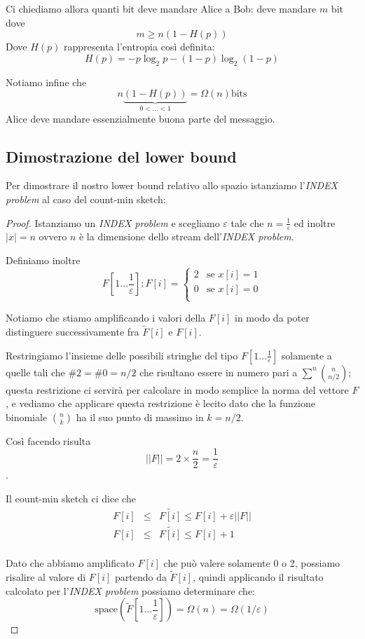 \documentclass[a4paper,11pt]{book}
\begin{document}
Ci chiediamo allora quanti bit deve mandare Alice a Bob: deve mandare $m$ bit dove $$m \geq n(1-H(p))$$
Dove $H(p)$ rappresenta l'entropia cos\`i definita: $$H(p) = -p \log_2 p - (1-p) \log_2 (1-p)$$

Notiamo infine che $$n\underbrace{(1 - H(p))}_{0 < \ldots < 1} = \Omega(n) \mbox{bits}$$ Alice deve mandare essenzialmente buona parte del messaggio.

\subsection{Dimostrazione del lower bound}

Per dimostrare il nostro lower bound relativo allo spazio istanziamo l'\emph{INDEX problem} al caso del count-min sketch:

\begin{proof}
Istanziamo un \emph{INDEX problem} e scegliamo $\varepsilon$ tale che $n = \frac{1}{\varepsilon}$ ed inoltre $|x| = n$ ovvero $n$ \`e la dimensione dello stream dell'\emph{INDEX problem}.

Definiamo inoltre $$F\left[1\ldots\frac{1}{\varepsilon}\right] : F[i] = \begin{cases}
2 & \mbox{se } x[i] = 1 \\
0 & \mbox{se } x[i] = 0 \\
\end{cases}$$

Notiamo che stiamo amplificando i valori della $F[i]$ in modo da poter distinguere successivamente fra $\tilde{F}[i]$ e $F[i]$. 

Restringiamo l'insieme delle possibili stringhe del tipo $F\left[1\ldots\frac{1}{\varepsilon}\right]$ solamente a quelle tali che $\#2 = \#0 = n/2$ che risultano essere in numero pari a $\sum^n \binom{n}{n/2}$; questa restrizione ci servir\`a per calcolare in modo semplice la norma del vettore $F$, e vediamo che applicare questa restrizione \`e lecito dato che la funzione binomiale $\binom{n}{k}$ ha il suo punto di massimo in $k= n/2$. 

Cos\`i facendo risulta $$||F|| = 2 \times \frac{n}{2} = \frac{1}{\varepsilon}$$.

Il count-min sketch ci dice che \begin{eqnarray}
F[i] & \leq & \tilde{F[i]} \leq F[i] + \varepsilon||F|| \nonumber \\
F[i] & \leq & \tilde{F[i]} \leq F[i] + 1 \nonumber \\
\end{eqnarray}

Dato che abbiamo amplificato $F[i]$ che pu\`o valere solamente 0 o 2, possiamo risalire al valore di $F[i]$ partendo da $\tilde{F}[i]$, quindi applicando il risultato calcolato per l'\emph{INDEX problem} possiamo determinare che: $$\mbox{space}\left(\tilde{F}\left[1\ldots\frac{1}{\varepsilon}\right]\right) = \Omega(n) = \Omega(1/\varepsilon)$$

\end{proof}
\end{document}
